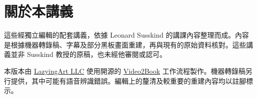 \documentclass[11pt,oneside]{book}
\begin{document}
\frontmatter
\hypersetup{pageanchor=false}

\hypersetup{pageanchor=true}

\clearpage
\chapter*{關於本講義}
這些經獨立編輯的配套講義，依據 Leonard Susskind 的講課內容整理而成。內容是根據機器轉錄稿、字幕及部分黑板畫面重建，再與現有的原始資料核對。這些講義並非 Susskind 教授的原稿，也未經他審閱或認可。

本版本由 \href{https://lazying.art}{LazyingArt LLC} 使用開源的 \href{https://github.com/lachlanchen/Video2Book}{Video2Book} 工作流程製作。機器轉錄稿另行提供，其中可能有語音辨識錯誤。編輯上的釐清及較重要的重建內容均以註腳標示。
\clearpage
\tableofcontents
\mainmatter










\end{document}
